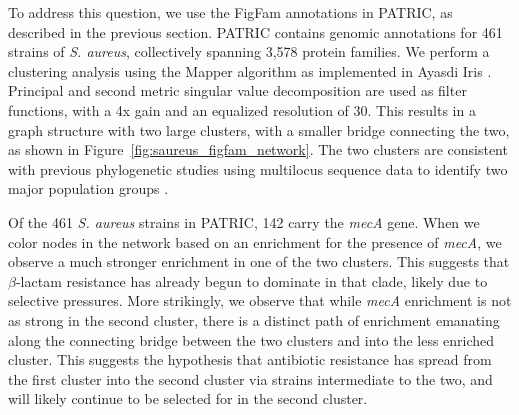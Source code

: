 To address this question, we use the FigFam annotations in PATRIC, as described in the previous section.
PATRIC contains genomic annotations for 461 strains of \emph{S. aureus}, collectively spanning 3,578 protein families.
We perform a clustering analysis using the Mapper algorithm as implemented in Ayasdi Iris \cite{AyasdiIris:2015}.
Principal and second metric singular value decomposition are used as filter functions, with a 4x gain and an equalized resolution of 30.
This results in a graph structure with two large clusters, with a smaller bridge connecting the two, as shown in Figure~\ref{fig:saureus_figfam_network}.
The two clusters are consistent with previous phylogenetic studies using multilocus sequence data to identify two major population groups \cite{Cooper:2006dp}.

Of the 461 \emph{S. aureus} strains in PATRIC, 142 carry the \emph{mecA} gene.
When we color nodes in the network based on an enrichment for the presence of \emph{mecA}, we observe a much stronger enrichment in one of the two clusters.
This suggests that $\beta$-lactam resistance has already begun to dominate in that clade, likely due to selective pressures.
More strikingly, we observe that while \emph{mecA} enrichment is not as strong in the second cluster, there is a distinct path of enrichment emanating along the connecting bridge between the two clusters and into the less enriched cluster.
This suggests the hypothesis that antibiotic resistance has spread from the first cluster into the second cluster via strains intermediate to the two, and will likely continue to be selected for in the second cluster.

